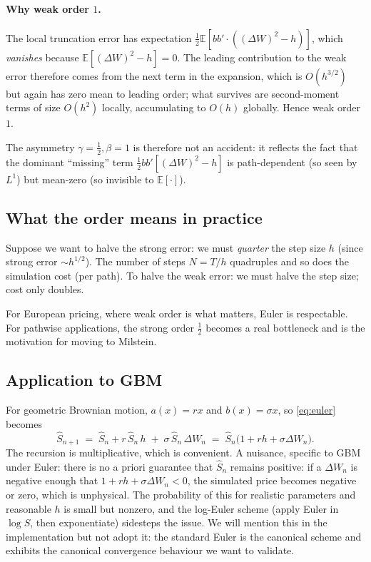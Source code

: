 \documentclass[11pt,a4paper]{article}
\theoremstyle{plain}
\theoremstyle{definition}
\theoremstyle{remark}
\newcommand{\E}{\mathbb{E}}
\begin{document}
\paragraph{Why weak order $1$.} The local truncation error has
expectation $\tfrac{1}{2} \E[b b' \cdot ((\Delta W)^2 - h)]$, which
\emph{vanishes} because $\E[(\Delta W)^2 - h] = 0$. The leading
contribution to the weak error therefore comes from the next term in
the expansion, which is $O(h^{3/2})$ but again has zero mean to
leading order; what survives are second-moment terms of size $O(h^2)$
locally, accumulating to $O(h)$ globally. Hence weak order $1$.

The asymmetry $\gamma = \tfrac{1}{2}, \beta = 1$ is therefore not an
accident: it reflects the fact that the dominant ``missing'' term
$\tfrac{1}{2} b b' [(\Delta W)^2 - h]$ is path-dependent (so seen by
$L^1$) but mean-zero (so invisible to $\E[\cdot]$).

\subsection{What the order means in practice}

Suppose we want to halve the strong error: we must \emph{quarter} the
step size $h$ (since strong error $\sim h^{1/2}$). The number of steps
$N = T/h$ quadruples and so does the simulation cost (per path). To
halve the weak error: we must halve the step size; cost only doubles.

For European pricing, where weak order is what matters, Euler is
respectable. For pathwise applications, the strong order
$\tfrac{1}{2}$ becomes a real bottleneck and is the motivation for
moving to Milstein.

\subsection{Application to GBM}

For geometric Brownian motion, $a(x) = r x$ and $b(x) = \sigma x$, so
\eqref{eq:euler} becomes
\begin{equation}
\label{eq:euler-gbm}
\hat S_{n+1} \;=\; \hat S_n + r\, \hat S_n\, h
\;+\; \sigma\, \hat S_n\, \Delta W_n
\;=\; \hat S_n \big(1 + r h + \sigma \Delta W_n\big).
\end{equation}
The recursion is multiplicative, which is convenient. A nuisance,
specific to GBM under Euler: there is no a priori guarantee that
$\hat S_n$ remains positive: if a $\Delta W_n$ is negative enough that
$1 + r h + \sigma \Delta W_n < 0$, the simulated price becomes
negative or zero, which is unphysical. The probability of this for
realistic parameters and reasonable $h$ is small but nonzero, and the
log-Euler scheme (apply Euler in $\log S$, then exponentiate)
sidesteps the issue. We will mention this in the implementation but
not adopt it: the standard Euler is the canonical scheme and exhibits
the canonical convergence behaviour we want to validate.
\end{document}
